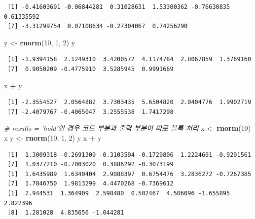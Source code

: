 \documentclass[
  11pt,
]{krantz}
\newenvironment{Shaded}{\begin{snugshade}}{\end{snugshade}}
\newcommand{\CommentTok}[1]{\textcolor[rgb]{0.37,0.37,0.37}{\textit{#1}}}
\newcommand{\DecValTok}[1]{\textcolor[rgb]{0.06,0.06,0.06}{#1}}
\newcommand{\KeywordTok}[1]{\textcolor[rgb]{0.27,0.27,0.27}{\textbf{#1}}}
\newcommand{\NormalTok}[1]{#1}
\newcommand{\OperatorTok}[1]{\textcolor[rgb]{0.43,0.43,0.43}{\textbf{#1}}}
\newcommand{\StringTok}[1]{\textcolor[rgb]{0.5,0.5,0.5}{#1}}
\begin{document}
\begin{verbatim}
 [1] -0.41603691 -0.06844281  0.31028631  1.53300362 -0.76630835  0.61335592
 [7] -3.31299754  0.07108634 -0.27304067  0.74256290
\end{verbatim}

\begin{Shaded}
\begin{Highlighting}[]
\NormalTok{y <-}\StringTok{ }\KeywordTok{rnorm}\NormalTok{(}\DecValTok{10}\NormalTok{, }\DecValTok{1}\NormalTok{, }\DecValTok{2}\NormalTok{)}
\NormalTok{y}
\end{Highlighting}
\end{Shaded}

\begin{verbatim}
 [1] -1.9394158  2.1249310  3.4200572  4.1174784  2.8067859  1.3769160
 [7]  0.9050209 -0.4775910  3.5285945  0.9991669
\end{verbatim}

\begin{Shaded}
\begin{Highlighting}[]
\NormalTok{x }\OperatorTok{+}\StringTok{ }\NormalTok{y}
\end{Highlighting}
\end{Shaded}

\begin{verbatim}
 [1] -2.3554527  2.0564882  3.7303435  5.6504820  2.0404776  1.9902719
 [7] -2.4079767 -0.4065047  3.2555538  1.7417298
\end{verbatim}

\normalsize

\footnotesize

\begin{Shaded}
\begin{Highlighting}[]
\CommentTok{# results = 'hold'인 경우 코드 부분과 출력 부분이 따로 블록 처리}
\NormalTok{x <-}\StringTok{ }\KeywordTok{rnorm}\NormalTok{(}\DecValTok{10}\NormalTok{)}
\NormalTok{x}
\NormalTok{y <-}\StringTok{ }\KeywordTok{rnorm}\NormalTok{(}\DecValTok{10}\NormalTok{, }\DecValTok{1}\NormalTok{, }\DecValTok{2}\NormalTok{)}
\NormalTok{y}
\NormalTok{x }\OperatorTok{+}\StringTok{ }\NormalTok{y}
\end{Highlighting}
\end{Shaded}

\begin{verbatim}
 [1]  1.3009318 -0.2691309 -0.3103594 -0.1729806  1.2224691 -0.9291561
 [7]  1.0377210 -0.7003020  0.3886292 -0.3073199
 [1]  1.6435989  1.6340404  2.9088397  0.6754476  3.2836272 -0.7267385
 [7]  1.7846750  1.9813299  4.4470268 -0.7369612
 [1]  2.944531  1.364909  2.598480  0.502467  4.506096 -1.655895  2.822396
 [8]  1.281028  4.835656 -1.044281
\end{verbatim}
\end{document}
